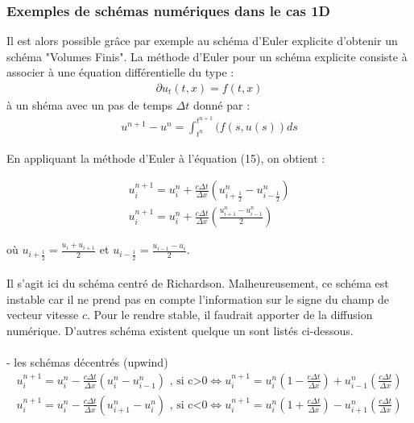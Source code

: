 \documentclass[12pt]{article}
\begin{document}
\subsubsection{Exemples de schémas numériques dans le cas 1D}

\noindent Il est alors possible grâce par exemple au schéma d'Euler explicite d'obtenir un schéma "Volumes Finis".
La méthode d'Euler pour un schéma explicite consiste à associer à une équation différentielle du type :
\begin{eqnarray}
        \partial u_t(t,x)=f(t,x)
\end{eqnarray}
à un shéma avec un pas de temps $\Delta t$ donné par :
\begin{eqnarray}
        u^{n+1}-u^{n} =  \int_{t^{n}}^{t^{n+1}}\big(f(s,u(s))ds
\end{eqnarray}

\noindent En appliquant la méthode d'Euler à l'équation (15), on obtient :

\begin{eqnarray}
        u^{n+1}_i=u_i^n+\frac{c\Delta t}{\Delta x}(u_{i+\frac{1}{2}}^n-u_{i-\frac{1}{2}}^n)
        \\u^{n+1}_i=u_i^n+\frac{c\Delta t}{\Delta x}(\frac{u_{i+1}^n-u_{i-1}^n}{2})
\end{eqnarray}

\noindent où $u_{i+\frac{1}{2}}=\frac{u_i+u_{i+1}}{2}$ et $u_{i-\frac{1}{2}}=\frac{u_{i-1}-u_{i}}{2}$.
\\
\\
\noindent Il s'agit ici du schéma centré de Richardson. Malheureusement, ce schéma est instable car il ne prend pas en compte l'information sur le signe du champ de vecteur vitesse $c$. Pour le rendre stable, il faudrait apporter de la diffusion numérique.
D'autres schéma existent quelque un sont listés ci-dessous.
\\
\\- les schémas décentrés (upwind)
\begin{eqnarray}
        u^{n+1}_i=u_i^n-\frac{c\Delta t}{\Delta x}({u_{i}^n-u_{i-1}^n}) \text{       , si c>0}
        \iff u^{n+1}_i=u_i^n(1-\frac{c\Delta t}{\Delta x})+u_{i-1}^n(\frac{c\Delta t}{\Delta x})	
        \\u^{n+1}_i=u_i^n-\frac{c\Delta t}{\Delta x}({u_{i+1}^n-u_{i}^n}) \text{       , si c<0}
        \iff u^{n+1}_i=u_i^n(1+\frac{c\Delta t}{\Delta x})-u_{i+1}^n(\frac{c\Delta t}{\Delta x})
\end{eqnarray}
\end{document}
